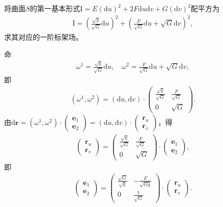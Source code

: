 \documentclass[../../main.tex]{subfiles}%
\begin{document}
\begin{example}
将曲面$S$的第一基本形式$\mathrm{I}=E(\mathrm{d}u)^2+2F\mathrm{d}u\mathrm{d}v+G(\mathrm{d}v)^2$配平方为
\begin{align*}
\mathrm{I}=\left(\frac{\sqrt{g}}{\sqrt{G}}\mathrm{d}u\right)^2+\left(\frac{F}{\sqrt{G}}\mathrm{d}u+\sqrt{G}\mathrm{d}v\right)^2,
\end{align*}
求其对应的一阶标架场。
\end{example}
\begin{solution}
命
\begin{align*}
\omega^1=\frac{\sqrt{g}}{\sqrt{G}}\mathrm{d}u,\quad \omega^2=\frac{F}{\sqrt{G}}\mathrm{d}u+\sqrt{G}\mathrm{d}v,
\end{align*}
即
\begin{align*}
(\omega^1,\omega^2)=(\mathrm{d}u,\mathrm{d}v)\cdot\begin{pmatrix}\frac{\sqrt{g}}{\sqrt{G}}&\frac{F}{\sqrt{G}}\\0&\sqrt{G}\end{pmatrix}.
\end{align*}
由$\mathrm{d}\boldsymbol{r}=(\omega^1,\omega^2)\cdot\begin{pmatrix}\boldsymbol{e}_1\\\boldsymbol{e}_2\end{pmatrix}=(\mathrm{d}u,\mathrm{d}v)\cdot\begin{pmatrix}\boldsymbol{r}_u\\\boldsymbol{r}_v\end{pmatrix}$，得
\begin{align*}
\begin{pmatrix}\boldsymbol{r}_u\\\boldsymbol{r}_v\end{pmatrix}=\begin{pmatrix}\frac{\sqrt{g}}{\sqrt{G}}&\frac{F}{\sqrt{G}}\\0&\sqrt{G}\end{pmatrix}\cdot\begin{pmatrix}\boldsymbol{e}_1\\\boldsymbol{e}_2\end{pmatrix},
\end{align*}
即
\begin{align*}
\begin{pmatrix}\boldsymbol{e}_1\\\boldsymbol{e}_2\end{pmatrix}=\begin{pmatrix}\frac{\sqrt{G}}{\sqrt{g}}&-\frac{F}{\sqrt{Gg}}\\0&\frac{1}{\sqrt{G}}\end{pmatrix}\cdot\begin{pmatrix}\boldsymbol{r}_u\\\boldsymbol{r}_v\end{pmatrix}.
\end{align*}

\end{solution}
\end{document}
